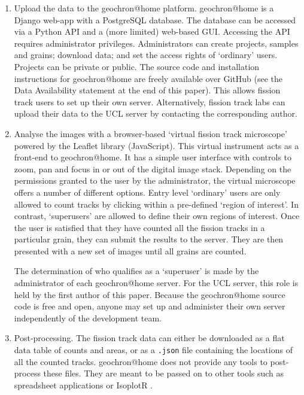 \documentclass{article}
\begin{document}
\begin{enumerate}
\item Upload the data to the geochron@home platform. geochron@home is
  a Django web-app with a PostgreSQL database.  The database can be
  accessed via a Python API and a (more limited) web-based
  GUI. Accessing the API requires administrator
  privileges. Administrators can create projects, samples and grains;
  download data; and set the access rights of `ordinary' users.
  Projects can be private or public. The source code and installation
  instructions for geochron@home are freely available over GitHub (see
  the Data Availability statement at the end of this paper). This
  allows fission track users to set up their own
  server. Alternatively, fission track labs can upload their data to
  the UCL server by contacting the corresponding author.

\item Analyse the images with a browser-based `virtual fission track
  microscope' powered by the Leaflet library (JavaScript). This
  virtual instrument acts as a front-end to geochron@home. It has a
  simple user interface with controls to zoom, pan and focus in or out
  of the digital image stack. Depending on the permissions granted to
  the user by the administrator, the virtual microscope offers a
  number of different options.  Entry level `ordinary' users are only
  allowed to count tracks by clicking within a pre-defined `region of
  interest'. In contrast, `superusers' are allowed to define their own
  regions of interest. Once the user is satisfied that they have
  counted all the fission tracks in a particular grain, they can
  submit the results to the server. They are then presented with a new
  set of images until all grains are counted.

  The determination of who qualifies as a `superuser' is made by the
  administrator of each geochron@home server. For the UCL server, this
  role is held by the first author of this paper. Because the
  geochron@home source code is free and open, anyone may set up and
  administer their own server independently of the development team.

\item Post-processing. The fission track data can either be downloaded
  as a flat data table of counts and areas, or as a \texttt{.json}
  file containing the locations of all the counted
  tracks. geochron@home does not provide any tools to post-process
  these files. They are meant to be passed on to other tools such as
  spreadsheet applications or IsoplotR \citep{vermeesch2018c}.
  
\end{enumerate}
  
\end{document}
